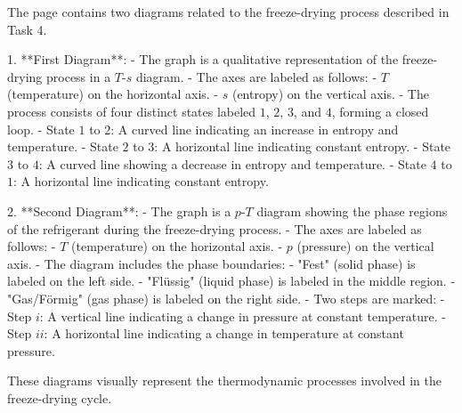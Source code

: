 The page contains two diagrams related to the freeze-drying process described in Task 4.

1. **First Diagram**:
   - The graph is a qualitative representation of the freeze-drying process in a \( T \)-\( s \) diagram.
   - The axes are labeled as follows:
     - \( T \) (temperature) on the horizontal axis.
     - \( s \) (entropy) on the vertical axis.
   - The process consists of four distinct states labeled \( 1 \), \( 2 \), \( 3 \), and \( 4 \), forming a closed loop. 
     - State \( 1 \) to \( 2 \): A curved line indicating an increase in entropy and temperature.
     - State \( 2 \) to \( 3 \): A horizontal line indicating constant entropy.
     - State \( 3 \) to \( 4 \): A curved line showing a decrease in entropy and temperature.
     - State \( 4 \) to \( 1 \): A horizontal line indicating constant entropy.

2. **Second Diagram**:
   - The graph is a \( p \)-\( T \) diagram showing the phase regions of the refrigerant during the freeze-drying process.
   - The axes are labeled as follows:
     - \( T \) (temperature) on the horizontal axis.
     - \( p \) (pressure) on the vertical axis.
   - The diagram includes the phase boundaries:
     - "Fest" (solid phase) is labeled on the left side.
     - "Flüssig" (liquid phase) is labeled in the middle region.
     - "Gas/Förmig" (gas phase) is labeled on the right side.
   - Two steps are marked:
     - Step \( i \): A vertical line indicating a change in pressure at constant temperature.
     - Step \( ii \): A horizontal line indicating a change in temperature at constant pressure.

These diagrams visually represent the thermodynamic processes involved in the freeze-drying cycle.